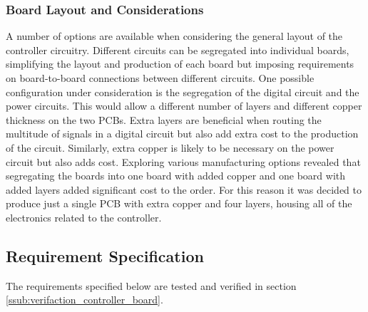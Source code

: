 \subsubsection{Board Layout and Considerations} %
\label{ssub:board_layout_and_considerations}
A number of options are available when considering the general layout of the controller circuitry.
Different circuits can be segregated into individual boards, simplifying the layout and production of each board but imposing requirements on board-to-board connections between different circuits.
One possible configuration under consideration is the segregation of the digital circuit and the power circuits.
This would allow a different number of layers and different copper thickness on the two PCBs.
Extra layers are beneficial when routing the multitude of signals in a digital circuit but also add extra cost to the production of the circuit.
Similarly, extra copper is likely to be necessary on the power circuit but also adds cost.
Exploring various manufacturing options revealed that segregating the boards into one board with added copper and one board with added layers added significant cost to the order.
For this reason it was decided to produce just a single PCB with extra copper and four layers, housing all of the electronics related to the controller.

\clearpage
\subsection{Requirement Specification}
The requirements specified below are tested and verified in section \ref{ssub:verifaction_controller_board}.
